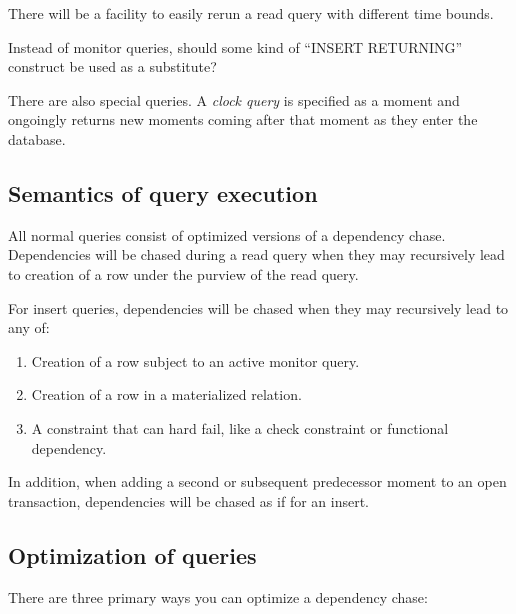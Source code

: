 \documentclass{article}
\begin{document}
There will be a facility to easily rerun a read query with different time bounds.
\begin{question}
	Instead of monitor queries, should some kind of ``INSERT RETURNING'' construct be used as a substitute?
\end{question}

There are also special queries.  A \emph{clock query} is specified as a moment and ongoingly returns new moments coming after that moment as they enter the database.

\subsection{Semantics of query execution}

All normal queries consist of optimized versions of a dependency chase.  Dependencies will be chased during a read query when they may recursively lead to creation of a row under the purview of the read query.

For insert queries, dependencies will be chased when they may recursively lead to any of:
\begin{enumerate}
	\item Creation of a row subject to an active monitor query.
	\item Creation of a row in a materialized relation.
	\item A constraint that can hard fail, like a check constraint or functional dependency.
\end{enumerate}

In addition, when adding a second or subsequent predecessor moment to an open transaction, dependencies will be chased as if for an insert.

\subsection{Optimization of queries}

There are three primary ways you can optimize a dependency chase:
\end{document}
